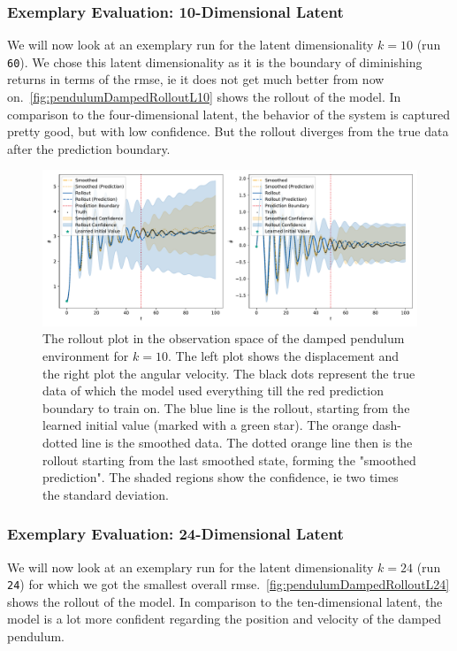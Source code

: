 		\subsubsection{Exemplary Evaluation: 10-Dimensional Latent}
			We will now look at an exemplary run for the latent dimensionality \( k = 10 \) (run \texttt{60}). We chose this latent dimensionality as it is the boundary of diminishing returns in terms of the \ac{rmse}, \ac{ie} it does not get much better from now on.~\autoref{fig:pendulumDampedRolloutL10} shows the rollout of the model. In comparison to the four-dimensional latent, the behavior of the system is captured pretty good, but with low confidence. But the rollout diverges from the true data after the prediction boundary.

			\begin{figure}
				\centering
				\includegraphics[width=\linewidth]{figures/results/pendulum-damped/run-latent-dim-10/rollout-observations-N0.pdf}
				\caption{The rollout plot in the observation space of the damped pendulum environment for \(k = 10\). The left plot shows the displacement and the right plot the angular velocity. The black dots represent the true data of which the model used everything till the red prediction boundary to train on. The blue line is the rollout, starting from the learned initial value (marked with a green star). The orange dash-dotted line is the smoothed data. The dotted orange line then is the rollout starting from the last smoothed state, forming the "smoothed prediction". The shaded regions show the confidence, \ac{ie} two times the standard deviation.}
				\label{fig:pendulumDampedRolloutL10}
			\end{figure}

		\subsubsection{Exemplary Evaluation: 24-Dimensional Latent}
			We will now look at an exemplary run for the latent dimensionality \( k = 24 \) (run \texttt{24}) for which we got the smallest overall \ac{rmse}.~\autoref{fig:pendulumDampedRolloutL24} shows the rollout of the model. In comparison to the ten-dimensional latent, the model is a lot more confident regarding the position and velocity of the damped pendulum.

